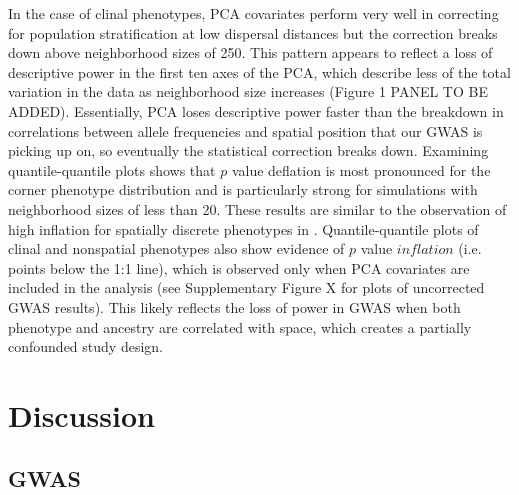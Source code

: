 \documentclass[9pt,twocolumn,twoside,lineno]{gsajnl}
\begin{document}
In the case of clinal phenotypes, PCA covariates perform very well in correcting for population stratification at low dispersal distances but the correction breaks down above neighborhood sizes of 250. This pattern appears to reflect a loss of descriptive power in the first ten axes of the PCA, which describe less of the total variation in the data as neighborhood size increases (Figure 1 PANEL TO BE ADDED). Essentially, PCA loses descriptive power faster than the breakdown in correlations between allele frequencies and spatial position that our GWAS is picking up on, so eventually the statistical correction breaks down. 
Examining quantile-quantile plots shows that $p$ value deflation is most pronounced for the corner phenotype distribution and is particularly strong for simulations with neighborhood sizes of less than 20. These results are similar to the observation of high inflation for spatially discrete phenotypes in \citep{Mathieson2012}. Quantile-quantile plots of clinal and nonspatial phenotypes also show evidence of $p$ value $inflation$ (i.e. points below the 1:1 line), which is observed only when PCA covariates are included in the analysis (see Supplementary Figure X for plots of uncorrected GWAS results). This likely reflects the loss of power in GWAS when both phenotype and ancestry are correlated with space, which creates a partially confounded study design. 


\section{Discussion}

\subsection{GWAS}

\end{document}
